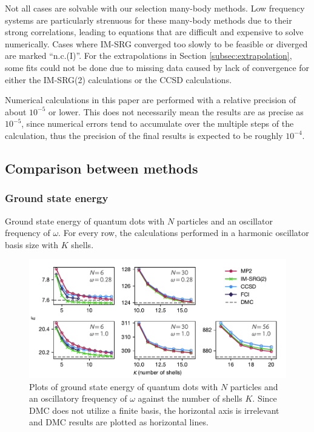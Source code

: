 Not all cases are solvable with our selection many-body methods.  Low
frequency systems are particularly strenuous for these many-body
methods due to their strong correlations, leading to equations that
are difficult and expensive to solve numerically.  Cases where IM-SRG
converged too slowly to be feasible or diverged are marked
``n.c.(I)''.  For the extrapolations in
Section \ref{subsec:extrapolation}, some fits could not be done due to
missing data caused by lack of convergence for either the IM-SRG(2) calculations or the CCSD calculations.

Numerical calculations in this paper are performed with a relative
precision of about $10^{-5}$ or lower.  This does not necessarily mean
the results are as precise as $10^{-5}$, since numerical errors tend
to accumulate over the multiple steps of the calculation, thus the
precision of the final results is expected to be roughly $10^{-4}$.

\subsection{Comparison between methods}

\subsubsection{Ground state energy}

\begin{table}
  \centering
  \caption{Ground state energy of quantum dots with $N$ particles and an oscillator frequency of $\omega$.  For every row, the calculations performed in a harmonic oscillator basis size with $K$ shells.}
  \label{tab:ground}
  
\end{table}

\begin{figure}
  \centering
  \includegraphics{fig-gs2.pdf}
  \caption{Plots of ground state energy of quantum dots with $N$ particles and an oscillatory frequency of $\omega$ against the number of shells $K$.  Since DMC does not utilize a finite basis, the horizontal axis is irrelevant and DMC results are plotted as horizontal lines.}
  \label{fig:gs}
\end{figure}

